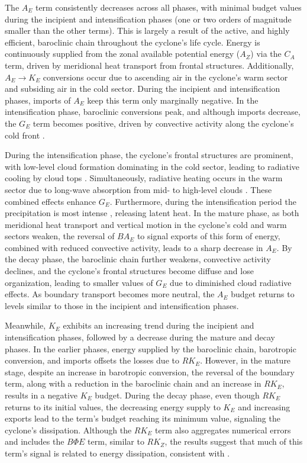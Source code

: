 \documentclass[pdflatex,sn-chicago]{sn-jnl}%
\theoremstyle{plain}
\theoremstyle{definition}
\theoremstyle{remark}
\theoremstyle{definition}
\begin{document}
The $A_E$ term consistently decreases across all phases, with minimal budget values during the incipient and intensification phases (one or two orders of magnitude smaller than the other terms). This is largely a result of the active, and highly efficient, baroclinic chain throughout the cyclone's life cycle. Energy is continuously supplied from the zonal available potential energy ($A_Z$) via the $C_A$ term, driven by meridional heat transport from frontal structures. Additionally, $A_E \rightarrow K_E$ conversions occur due to ascending air in the cyclone's warm sector and subsiding air in the cold sector. During the incipient and intensification phases, imports of $A_E$ keep this term only marginally negative. In the intensification phase, baroclinic conversions peak, and although imports decrease, the $G_E$ term becomes positive, driven by convective activity along the cyclone’s cold front \citep[e.g.][]{govekar2011three}. 

During the intensification phase, the cyclone's frontal structures are prominent, with low-level cloud formation dominating in the cold sector, leading to radiative cooling by cloud tops \citep{govekar2011three,voigt2023tug}. Simultaneously, radiative heating occurs in the warm sector due to long-wave absorption from mid- to high-level clouds \citep{lau1997comparing,keshtgar2023cloud}. These combined effects enhance $G_E$. Furthermore, during the intensification period the precipitation is most intense \citep{mcerlich2023assessment}, releasing latent heat. In the mature phase, as both meridional heat transport and vertical motion in the cyclone's cold and warm sectors weaken, the reversal of $BA_E$ to signal exports of this form of energy, combined with reduced convective activity, leads to a sharp decrease in $A_E$. By the decay phase, the baroclinic chain further weakens, convective activity declines, and the cyclone's frontal structures become diffuse and lose organization, leading to smaller values of $G_E$ due to diminished cloud radiative effects. As boundary transport becomes more neutral, the $A_E$ budget returns to levels similar to those in the incipient and intensification phases.

Meanwhile, $K_E$ exhibits an increasing trend during the incipient and intensification phases, followed by a decrease during the mature and decay phases. In the earlier phases, energy supplied by the baroclinic chain, barotropic conversion, and imports offsets the losses due to $RK_E$. However, in the mature stage, despite an increase in barotropic conversion, the reversal of the boundary term, along with a reduction in the baroclinic chain and an increase in $RK_E$, results in a negative $K_E$ budget. During the decay phase, even though $RK_E$ returns to its initial values, the decreasing energy supply to $K_E$ and increasing exports lead to the term's budget reaching its minimum value, signaling the cyclone's dissipation. Although the $RK_E$ term also aggregates numerical errors and includes the $B\Phi E$ term, similar to $RK_Z$, the results suggest that much of this term's signal is related to energy dissipation, consistent with \citet{smith1980energetics}.
\end{document}
